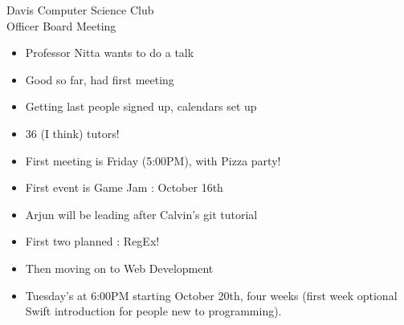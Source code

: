 \documentclass{article}
\begin{document}
\begin{Minutes}{Davis Computer Science Club\\Officer Board Meeting}

\begin{itemize}
\item Professor Nitta wants to do a talk
\end{itemize}

\begin {itemize}
\item Good so far, had first meeting
\item Getting last people signed up, calendars set up
\item 36 (I think) tutors!
\end {itemize}

\begin {itemize}
\item First meeting is Friday (5:00PM), with Pizza party!
\item First event is Game Jam : October 16th
\end {itemize}

\begin {itemize}
\item Arjun will be leading after Calvin’s git tutorial
\item First two planned : RegEx!
\item Then moving on to Web Development
\end {itemize}

\begin {itemize}
\item Tuesday’s at 6:00PM starting October 20th, four weeks (first week optional Swift introduction for people new to programming).
\end{itemize}

\end{Minutes}
\thispagestyle{creditfooter}
\end{document}
